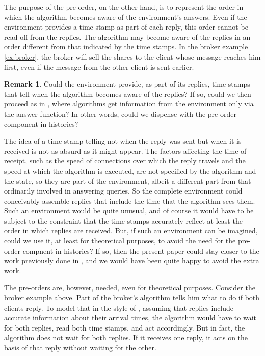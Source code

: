 \documentclass{LMCS}
\theoremstyle{definition}
\newtheorem{rmk}[thm]{Remark}
\begin{document}
The purpose of the pre-order, on the other hand, is to represent the
order in which the algorithm becomes aware of the environment's
answers.  Even if the environment provides a time-stamp as part of
each reply, this order cannot be read off from the replies.  The
algorithm may become aware of the replies in an order different from
that indicated by the time stamps. In the
broker example \ref{ex:broker}, the broker will sell the shares to the
client whose message reaches him first, even if the message from the
other client is sent earlier.

\begin{rmk} \label{time-stamp} Could the environment provide, as part
  of its replies, time stamps that tell when the algorithm becomes
  aware of the replies?  If so, could we then proceed as in
  \cite{oa1}, where algorithms get information from the environment
  only via the answer function?  In other words, could we dispense
  with the pre-order component in histories?

  The idea of a time stamp telling not when the reply was sent but
  when it is received is not as absurd as it might appear.  The
  factors affecting the time of receipt, such as the speed of
  connections over which the reply travels and the speed at which the
  algorithm is executed, are not specified by the algorithm and the
  state, so they are part of the environment, albeit a different part
  from that ordinarily involved in answering queries.  So the complete
  environment could conceivably assemble replies that include the time
  that the algorithm sees them.  Such an environment would be quite
  unusual, and of course it would have to be subject to the constraint
  that the time stamps accurately reflect at least the order in which
  replies are received.  But, if such an environment can be imagined,
  could we use it, at least for theoretical purposes, to avoid the
  need for the pre-order compnent in histories?  If so, then the
  present paper could stay closer to the work previously done in
  \cite{oa1,oa2,oa3}, and we would have been quite happy to avoid the
  extra work.

  The pre-orders are, however, needed, even for theoretical purposes.
Consider the broker example above.  Part of the broker's algorithm
tells him what to do if both clients reply.  To model that in the
style of \cite{oa1}, assuming that replies include accurate
information about their arrival times, the algorithm would have to
wait for both replies, read both time stamps, and act accordingly.
But in fact, the algorithm does not wait for both replies.  If it
receives one reply, it acts on the basis of that reply without waiting
for the other.  


\end{rmk}
\end{document}

